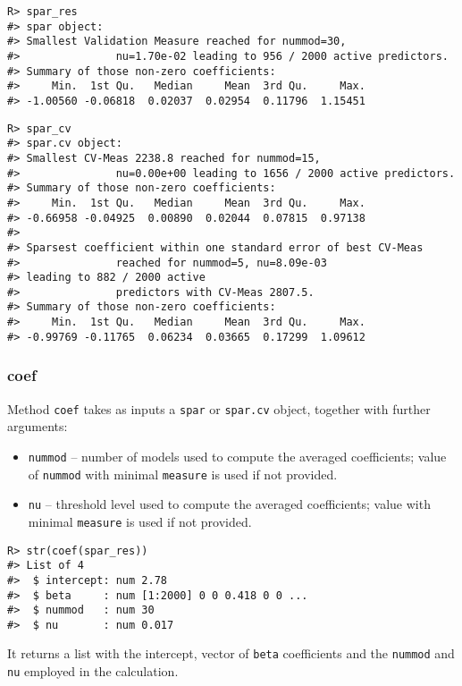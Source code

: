\documentclass[
  article]{jss}
\begin{document}
\begin{verbatim}
R> spar_res
#> spar object:
#> Smallest Validation Measure reached for nummod=30,
#>               nu=1.70e-02 leading to 956 / 2000 active predictors.
#> Summary of those non-zero coefficients:
#>     Min.  1st Qu.   Median     Mean  3rd Qu.     Max. 
#> -1.00560 -0.06818  0.02037  0.02954  0.11796  1.15451
\end{verbatim}

\begin{verbatim}
R> spar_cv
#> spar.cv object:
#> Smallest CV-Meas 2238.8 reached for nummod=15,
#>               nu=0.00e+00 leading to 1656 / 2000 active predictors.
#> Summary of those non-zero coefficients:
#>     Min.  1st Qu.   Median     Mean  3rd Qu.     Max. 
#> -0.66958 -0.04925  0.00890  0.02044  0.07815  0.97138 
#> 
#> Sparsest coefficient within one standard error of best CV-Meas
#>               reached for nummod=5, nu=8.09e-03 
#> leading to 882 / 2000 active
#>               predictors with CV-Meas 2807.5.
#> Summary of those non-zero coefficients:
#>     Min.  1st Qu.   Median     Mean  3rd Qu.     Max. 
#> -0.99769 -0.11765  0.06234  0.03665  0.17299  1.09612
\end{verbatim}

\subsubsection{coef}\label{coef}

Method \texttt{coef} takes as inputs a \texttt{spar} or \texttt{spar.cv}
object, together with further arguments:

\begin{itemize}
\item
  \texttt{nummod} -- number of models used to compute the averaged
  coefficients; value of \texttt{nummod} with minimal \texttt{measure}
  is used if not provided.
\item
  \texttt{nu} -- threshold level used to compute the averaged
  coefficients; value with minimal \texttt{measure} is used if not
  provided.
\end{itemize}

\begin{verbatim}
R> str(coef(spar_res))
#> List of 4
#>  $ intercept: num 2.78
#>  $ beta     : num [1:2000] 0 0 0.418 0 0 ...
#>  $ nummod   : num 30
#>  $ nu       : num 0.017
\end{verbatim}

It returns a list with the intercept, vector of \texttt{beta}
coefficients and the \texttt{nummod} and \texttt{nu} employed in the
calculation.
\end{document}
